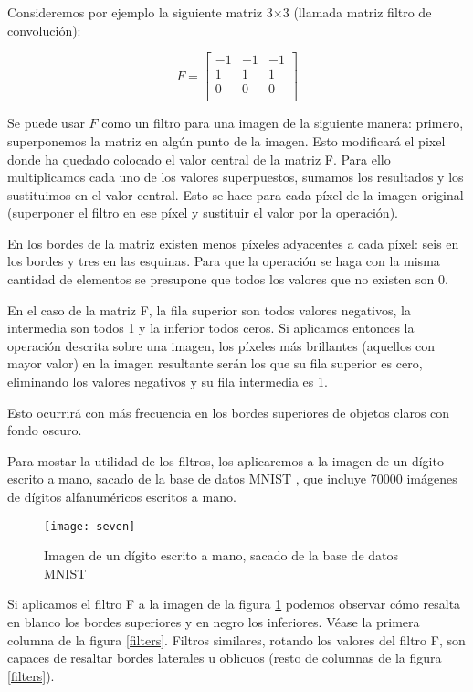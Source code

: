 Consideremos por ejemplo la siguiente matriz 3$\times$3 (llamada matriz filtro de convolución):

\[
  F=
  \left[ {\begin{array}{ccc}
   -1 & -1 & -1 \\
   1 & 1 & 1 \\
   0 & 0 & 0 \\
  \end{array} } \right]
\]

Se puede usar $F$ como un filtro para una imagen de la siguiente manera: primero, superponemos la matriz en algún punto de la imagen. Esto modificará el pixel donde ha quedado colocado el valor central de la matriz F. Para ello multiplicamos cada uno de los valores superpuestos, sumamos los resultados y los sustituimos en el valor central. Esto se hace para cada píxel de la imagen original (superponer el filtro en ese píxel y sustituir el valor por la operación).

En los bordes de la matriz existen menos píxeles adyacentes a cada píxel: seis en los bordes y tres en las esquinas. Para que la operación se haga con la misma cantidad de elementos se presupone que todos los valores que no existen son 0.

En el caso de la matriz F, la fila superior son todos valores negativos, la intermedia son todos 1 y la inferior todos ceros. Si aplicamos entonces la operación descrita sobre una imagen, los píxeles más brillantes (aquellos con mayor valor) en la imagen resultante serán los que su fila superior es cero, eliminando los valores negativos y su fila intermedia es 1. 

Esto ocurrirá con más frecuencia en los bordes superiores de objetos claros con fondo oscuro.

Para mostar la utilidad de los filtros, los aplicaremos a la imagen de un dígito escrito a mano, sacado de la base de datos MNIST \parencite{lecun-mnisthandwrittendigit-2010}, que incluye 70000 imágenes de dígitos alfanuméricos escritos a mano.

\begin{figure}
    \centering
    \caption{Imagen de un dígito escrito a mano, sacado de la base de datos MNIST}
  \label{seven}
  \texttt{[image: seven]}
\end{figure}

Si aplicamos el filtro F a la imagen de la figura \ref{seven} podemos observar cómo resalta en blanco los bordes superiores y en negro los inferiores. Véase la primera columna de la figura \ref{filters}. Filtros similares, rotando los valores del filtro F, son capaces de resaltar bordes laterales u oblicuos (resto de columnas de la figura \ref{filters}).

